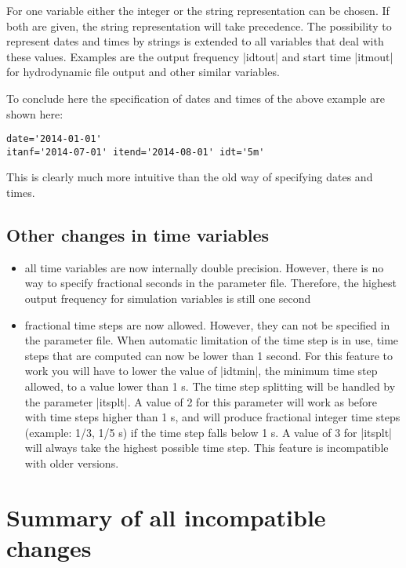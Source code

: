 \documentclass[12pt,draft]{article}
\begin{document}
For one variable either the integer or the string representation 
can be chosen. If both are given, the string representation
will take precedence. The possibility to represent dates and times
by strings is extended to all variables that deal with these 
values. Examples are the output frequency |idtout| 
and start time |itmout| for
hydrodynamic file output and other similar variables.

To conclude here the specification of dates and times of the
above example are shown here:
\begin{verbatim}
date='2014-01-01' 
itanf='2014-07-01' itend='2014-08-01' idt='5m' 
\end{verbatim}
This is clearly much more intuitive than the old 
way of specifying dates and times.






\subsection{Other changes in time variables}


\begin{itemize}
\item all time variables are now internally double precision. 
However, there is no way to specify fractional seconds
in the parameter file. Therefore, the highest output
frequency for simulation variables is still one second
\item fractional time steps are now allowed. However, they can
not be specified in the parameter file. 
When automatic limitation of the time step is in use, time
steps that are computed can now be lower than 1 second. For this feature
to work you will have to lower the value of |idtmin|, the minimum
time step allowed, to a value lower than 1 s. The time step splitting
will be handled by the parameter |itsplt|. A value of 2 for this
parameter will work as before with time steps higher than 1 s, and will
produce fractional integer time steps (example: 1/3, 1/5 s) if the time
step falls below 1 s. A value of 3 for |itsplt| will always take the
highest possible time step. This feature is incompatible with older
versions.

\end{itemize}



\section{Summary of all incompatible changes}
\end{document}

